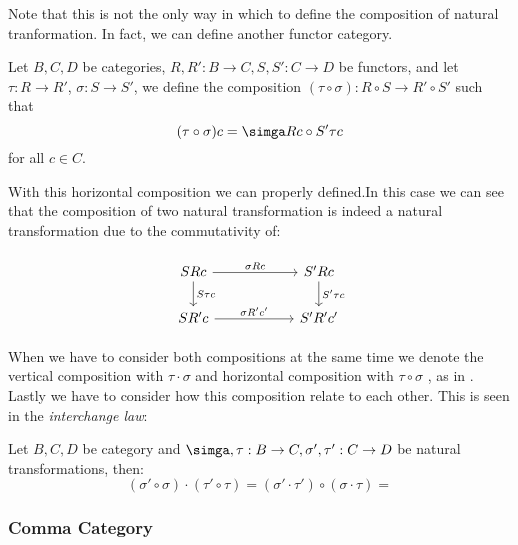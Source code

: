 Note that this is not the only way in which to define the composition of natural tranformation. In fact, we can define another functor category.

\begin{definition}\label{horizontal-composition}
Let $B,C,D$ be categories, $R,R': B \to C, S,S':C\to D$ be functors, and let $\tau: R \to R'$, $\sigma:S\to S'$, we define the composition $(\tau \circ \sigma): R\circ S \to R'\circ S'$ such that $$(\tau \circ \sigma) c = \simga R c \circ S' \tau c$$  for all $c\in C$.
\end{definition}

With this horizontal composition we can properly defined.In this case we can see that the composition of two natural transformation is indeed a natural transformation due to the commutativity of:

\[
  \begin{tikzpicture}
  \node {\begin{tikzcd}[column sep=20mm]
      SRc\ar[r,"\sigma R c"]\ar[d,"S\tau c"] & S'Rc\ar[d,"S'\tau c"]\\
      SR'c\ar[r,"\sigma R'c'"] & S'R'c'
  \end{tikzcd}};
\end{tikzpicture}
\]



When we have to consider both compositions at the same time we denote the vertical composition with $\tau \cdot \sigma$ and horizontal composition with $\tau \circ \sigma$ , as in  \cite{mac2013categories}. Lastly we have to consider how this composition relate to each other. This is seen in the \emph{interchange law}:

\begin{proposition}
  Let $B,C,D$ be category and $\simga,\tau: B \to C,\sigma',\tau': C \to D$ be natural transformations, then:
  $$(\sigma' \circ \sigma)\cdot (\tau' \circ \tau) = (\sigma' \cdot \tau')\circ (\sigma\cdot \tau) = $$
\end{proposition}


\subsubsection{Comma Category}


